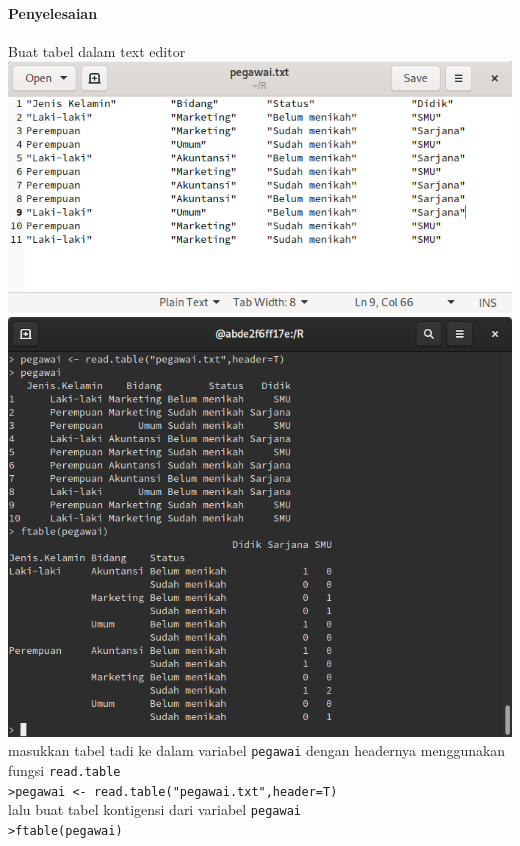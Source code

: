 \documentclass[a4paper,12pt]{article}
\begin{document}
\paragraph{Penyelesaian\\}
Buat tabel dalam text editor\\
\includegraphics[width=\linewidth]{pegawaitxt}
\includegraphics[width=\linewidth]{6}
masukkan tabel tadi ke dalam variabel \texttt{pegawai} dengan headernya menggunakan fungsi \texttt{read.table}\\
\texttt{>pegawai <- read.table("pegawai.txt",header=T)}\\
lalu buat tabel kontigensi dari variabel \texttt{pegawai}\\
\texttt{>ftable(pegawai)}
\end{document}
